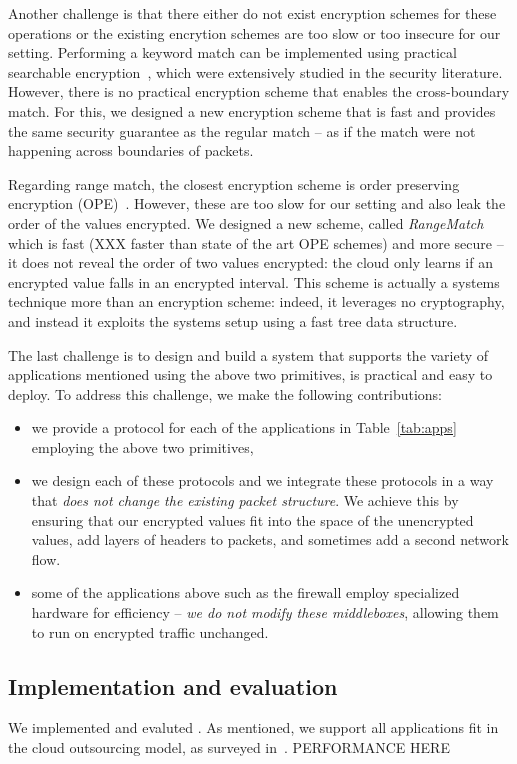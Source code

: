 Another challenge is that there either do not exist encryption schemes for these operations or the existing encrytion schemes are too slow or too insecure for our setting. Performing a keyword match can be implemented using practical searchable encryption~\cite{song, blindbox, X}, which were extensively studied in the security literature.
However, there is no practical encryption scheme that enables the cross-boundary match. 
For this, we designed a new encryption scheme that is fast and provides the same security guarantee as the regular match -- as if the match were not happening across boundaries of packets. 

Regarding range match, the closest encryption scheme is order preserving encryption (OPE)~\cite{mope, BCLO}. However, these are too slow for our setting and also leak the order of the values encrypted. We designed a new scheme, called {\em RangeMatch} which is fast (XXX faster than state of the art OPE schemes) and more secure -- it does not reveal the order of two values encrypted: the cloud only learns if an encrypted value falls in an encrypted interval. This scheme is actually a systems technique more than an encryption scheme: indeed, it leverages no cryptography, and instead it exploits the systems setup using a fast tree data structure. 

The last challenge is to design and build a system that supports the variety of applications mentioned using the above two primitives, is practical and easy to deploy. 
To address this challenge, we make the following contributions:
\begin{itemize}
\item we provide a protocol for each of the applications in Table~\ref{tab:apps} employing the above two primitives,
\item we design each of these protocols and we integrate these protocols in a way that {\em does not change the existing packet structure}. We achieve this by ensuring that our encrypted values fit into the space of the unencrypted values, add layers of headers to packets, and sometimes add a second network flow.
\item some of the applications above such as the firewall employ specialized hardware for efficiency -- {\em we do not modify these middleboxes}, allowing them to run on encrypted traffic unchanged. 
\end{itemize}


\subsection{Implementation and evaluation}

We implemented and evaluted \sys. As mentioned, we support all applications fit in the cloud outsourcing model, as surveyed in~\cite{aplomb}. PERFORMANCE HERE
